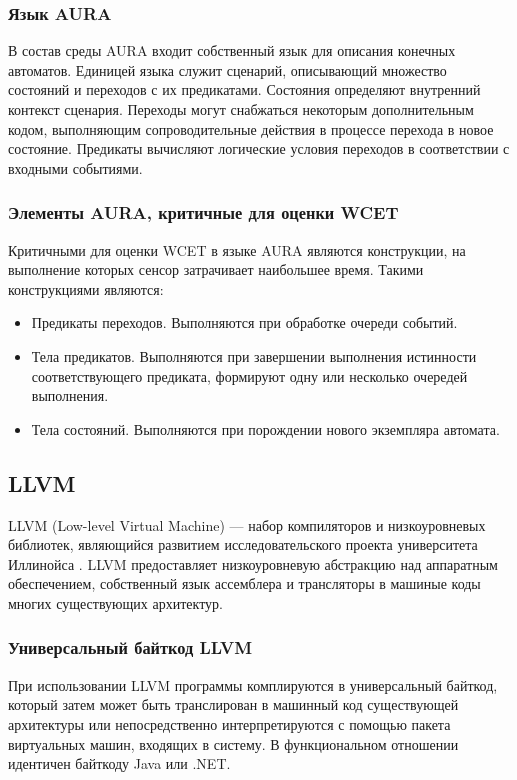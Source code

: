 \documentclass[12pt,a4paper]{article}
\begin{document}
\subsubsection{Язык AURA}
В состав среды AURA входит собственный язык для описания конечных автоматов. Единицей языка служит сценарий, описывающий множество состояний и переходов с их предикатами. Состояния определяют внутренний контекст сценария. Переходы могут снабжаться некоторым дополнительным кодом, выполняющим сопроводительные действия в процессе перехода в новое состояние. Предикаты вычисляют логические условия переходов в соответствии с входными событиями.

\subsubsection{Элементы AURA, критичные для оценки WCET}
Критичными для оценки WCET в языке AURA являются конструкции, на выполнение которых сенсор затрачивает наибольшее время. Такими конструкциями являются:
\begin{itemize}
\item Предикаты переходов. Выполняются при обработке очереди событий. 
\item Тела предикатов. Выполняются при завершении выполнения истинности соответствующего предиката, формируют одну или несколько очередей выполнения.
\item Тела состояний. Выполняются при порождении нового экземпляра автомата.
\end{itemize}

\subsection{LLVM}
LLVM (Low-level Virtual Machine) --- набор компиляторов и низкоуровневых библиотек, являющийся развитием исследовательского проекта университета Иллинойса \cite{llvm}. LLVM предоставляет низкоуровневую абстракцию над аппаратным обеспечением, собственный язык ассемблера и трансляторы в машиные коды многих существующих архитектур.

\subsubsection{Универсальный байткод LLVM}
При использовании LLVM программы комплируются в универсальный байткод, который затем может быть транслирован в машинный код существующей архитектуры или непосредственно интерпретируются с помощью пакета виртуальных машин, входящих в систему. В функциональном отношении идентичен байткоду Java или .NET.
\end{document}
